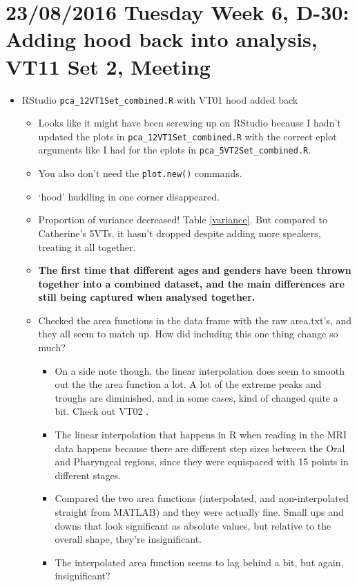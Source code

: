\documentclass{article}
\begin{document}
\section*{23/08/2016 Tuesday Week 6, D-30: Adding hood back into analysis, VT11 Set 2, Meeting}
\begin{itemize}
    \item RStudio \verb|pca_12VT1Set_combined.R| with VT01 hood added back
    \begin{itemize}
        \item Looks like it might have been screwing up on RStudio because I hadn't updated the plots in \verb|pca_12VT1Set_combined.R| with the correct eplot arguments like I had for the eplots in \verb|pca_5VT2Set_combined.R|.
        \item You also don't need the \verb|plot.new()| commands.
        \item `hood' huddling in one corner disappeared.
        \item Proportion of variance decreased! Table \ref{variance}. But compared to Catherine's 5VTs, it hasn't dropped despite adding more speakers, treating it all together. 
        \item \textbf{The first time that different ages and genders have been thrown together into a combined dataset, and the main differences are still being captured when analysed together.}
        \item Checked the area functions in the data frame with the raw area.txt's, and they all seem to match up. How did including this one thing change so much? 
        \begin{itemize}
            \item On a side note though, the linear interpolation does seem to smooth out the the area function a lot. A lot of the extreme peaks and troughs are diminished, and in some cases, kind of changed quite a bit. Check out VT02 .
            \item The linear interpolation that happens in R when reading in the MRI data happens because there are different step sizes between the Oral and Pharyngeal regions, since they were equispaced with 15 points in different stages.
            \item Compared the two area functions (interpolated, and non-interpolated straight from MATLAB) and they were actually fine. Small ups and downs that look significant as absolute values, but relative to the overall shape, they're insignificant.
            \item The interpolated area function seems to lag behind a bit, but again, insignificant?

\end{itemize}
\end{itemize}
\end{itemize}
\end{document}
